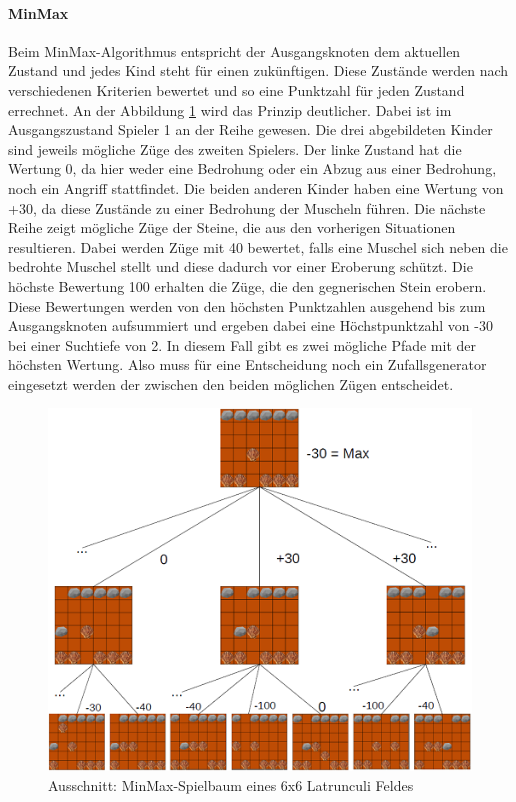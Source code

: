 \paragraph{MinMax}
Beim MinMax-Algorithmus entspricht der Ausgangsknoten dem aktuellen Zustand und jedes Kind steht für einen zukünftigen. Diese Zustände werden nach verschiedenen Kriterien bewertet und so eine Punktzahl für jeden Zustand errechnet. An der Abbildung \ref{fig:Spielbaum} wird das Prinzip deutlicher. Dabei ist im Ausgangszustand Spieler 1 an der Reihe gewesen. Die drei abgebildeten Kinder sind jeweils mögliche Züge des zweiten Spielers. Der linke Zustand hat die Wertung 0, da hier weder eine Bedrohung oder ein Abzug aus einer Bedrohung, noch ein Angriff stattfindet. Die beiden anderen Kinder haben eine Wertung von +30, da diese Zustände zu einer Bedrohung der Muscheln führen. Die nächste Reihe zeigt mögliche Züge der Steine, die aus den vorherigen Situationen resultieren. Dabei werden Züge mit 40 bewertet, falls eine Muschel sich neben die bedrohte Muschel stellt und diese dadurch vor einer Eroberung schützt. Die höchste Bewertung 100 erhalten die Züge, die den gegnerischen Stein erobern. Diese Bewertungen werden von den höchsten Punktzahlen ausgehend bis zum Ausgangsknoten aufsummiert und ergeben dabei eine Höchstpunktzahl von -30 bei einer Suchtiefe von 2. In diesem Fall gibt es zwei mögliche Pfade mit der höchsten Wertung. Also muss für eine Entscheidung noch ein Zufallsgenerator eingesetzt werden der zwischen den beiden möglichen Zügen entscheidet.

\begin{figure}[h]
	\centering
	\includegraphics{img/Spielbaum_latrun3}
	\caption{ Ausschnitt: MinMax-Spielbaum eines 6x6 Latrunculi Feldes}
	\label{fig:Spielbaum}
\end{figure}

